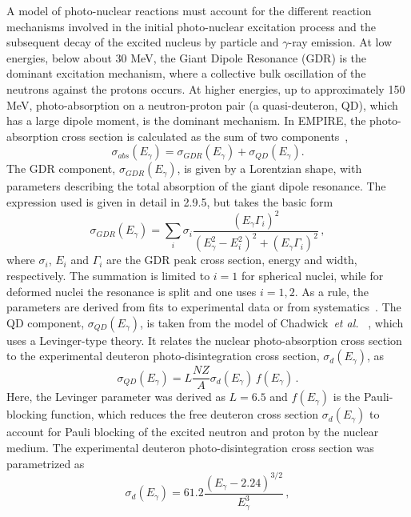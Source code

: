 A model of photo-nuclear reactions must account for the different reaction
mechanisms involved in the initial photo-nuclear excitation process and the
subsequent decay of the excited nucleus by particle and $\gamma$-ray
emission. At low energies, below about 30 MeV, the Giant Dipole Resonance
(GDR) is the dominant excitation mechanism, where a collective bulk
oscillation of the neutrons against the protons occurs. At higher energies,
up to approximately 150 MeV, photo-absorption on a neutron-proton pair (a
quasi-deuteron, QD), which has a large dipole moment, is the dominant
mechanism. In EMPIRE, the photo-absorption cross section is calculated as the
sum of two components~\cite{PHNuc},
\begin{equation}
\sigma_{abs}(E_{\gamma})=\sigma_{GDR}(E_{\gamma})+\sigma_{QD}(E_{\gamma}).
\end{equation}
The GDR component, $\sigma_{GDR}(E_{\gamma})$, is given by a Lorentzian
shape, with parameters describing the total absorption of the giant dipole
resonance. The expression used is given in detail in 2.9.5, but takes the
basic form
\begin{equation}
\sigma_{GDR}(E_{\gamma})=\sum_{i}\sigma_{i}%
\frac{(E_{\gamma}\Gamma_{i})^{2}}{(E_{\gamma}^{2}-E_{i}^{2})^{2}+(E_{\gamma}%
\Gamma_{i})^{2}}\,,
\end{equation}
\noindent where $\sigma_{i}$, $E_{i}$ and $\Gamma_{i}$ are the GDR peak
cross section, energy and width, respectively. The summation is limited to $%
i=1$ for spherical nuclei, while for deformed nuclei the resonance is split
and one uses $i=1,2$. As a rule, the parameters are derived from fits to
experimental data or from systematics~\cite{RIPL2}. The QD component, $%
\sigma_{QD}(E_{\gamma})$, is taken from the model of Chadwick~\emph{et al.}~%
\cite{chadQD}, which uses a Levinger-type theory. It relates the nuclear
photo-absorption cross section to the experimental deuteron
photo-disintegration cross section, $\sigma_{d}(E_{\gamma})$, as
\begin{equation}
\sigma_{QD}(E_{\gamma})=L\frac{NZ}{A}\sigma_{d}(E_{\gamma})\,
f(E_{\gamma})\,.
\end{equation}
Here, the Levinger parameter was derived as $L=6.5$ and $f(E_{\gamma})$ is
the Pauli-blocking function, which reduces the free deuteron cross section $%
\sigma_{d}(E_{\gamma})$ to account for Pauli blocking of the excited neutron
and proton by the nuclear medium. The experimental deuteron
photo-disintegration cross section was parametrized as
\begin{equation}
\sigma_{d}(E_{\gamma})=61.2\frac{(E_{\gamma}-2.24)^{3/2}}{E_{\gamma}^{3}}\,,
\end{equation}
